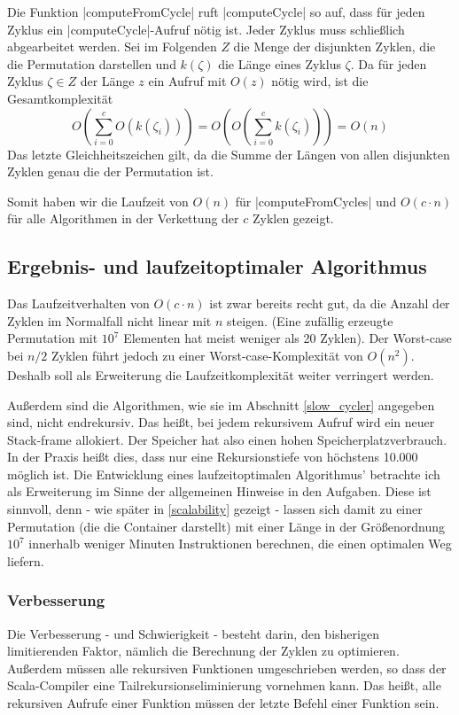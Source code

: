 Die Funktion |computeFromCycle| ruft |computeCycle| so auf, dass für jeden Zyklus ein |computeCycle|-Aufruf nötig ist. Jeder Zyklus muss schließlich abgearbeitet werden.
Sei im Folgenden $Z$ die Menge der disjunkten Zyklen, die die Permutation darstellen und $k(\zeta)$ die Länge eines Zyklus $\zeta$.
Da für jeden Zyklus $\zeta \in Z$ der Länge $z$ ein Aufruf mit $O(z)$ nötig wird, ist die Gesamtkomplexität
\[O(\sum_{i=0}^{c}{O(k(\zeta_i))})=O(O(\sum_{i=0}^{c}{k(\zeta_i)}))=O(n)\]
Das letzte Gleichheitszeichen gilt, da die Summe der Längen von allen disjunkten Zyklen genau die der Permutation ist.

Somit haben wir die Laufzeit von $O(n)$ für |computeFromCycles| und $O(c \cdot n)$ für alle Algorithmen in der Verkettung der $c$ Zyklen gezeigt.
\clearpage
\subsection{Ergebnis- und laufzeitoptimaler Algorithmus}
\label{fast_cycler}
Das Laufzeitverhalten von $O(c \cdot n)$ ist zwar bereits recht gut, da die Anzahl der Zyklen im Normalfall nicht linear mit $n$ steigen.
(Eine zufällig erzeugte Permutation mit $10^7$ Elementen hat meist weniger als 20 Zyklen).
Der Worst-case bei $n/2$ Zyklen führt jedoch zu einer Worst-case-Komplexität von $O(n^2)$.
Deshalb soll als Erweiterung die Laufzeitkomplexität weiter verringert werden.

Außerdem sind die Algorithmen, wie sie im Abschnitt \ref{slow_cycler} angegeben sind, nicht endrekursiv.
Das heißt, bei jedem rekursivem Aufruf wird ein neuer Stack-frame allokiert.
Der Speicher hat also einen hohen Speicherplatzverbrauch.
In der Praxis heißt dies, dass nur eine Rekursionstiefe von höchstens 10.000 möglich ist.
Die Entwicklung eines laufzeitoptimalen Algorithmus' betrachte ich als Erweiterung im Sinne der allgemeinen Hinweise in den Aufgaben.
Diese ist sinnvoll, denn - wie später in \ref{scalability} gezeigt -
lassen sich damit zu einer Permutation (die die Container darstellt)
mit einer Länge in der Größenordnung $10^7$ innerhalb weniger Minuten Instruktionen berechnen, die einen optimalen Weg liefern.
\subsubsection{Verbesserung}
Die Verbesserung - und Schwierigkeit - besteht darin, den bisherigen limitierenden Faktor, nämlich die Berechnung der Zyklen zu optimieren.
Außerdem müssen alle rekursiven Funktionen umgeschrieben werden, so dass der Scala-Compiler eine Tailrekursionseliminierung vornehmen kann.
Das heißt, alle rekursiven Aufrufe einer Funktion müssen der letzte Befehl einer Funktion sein.

